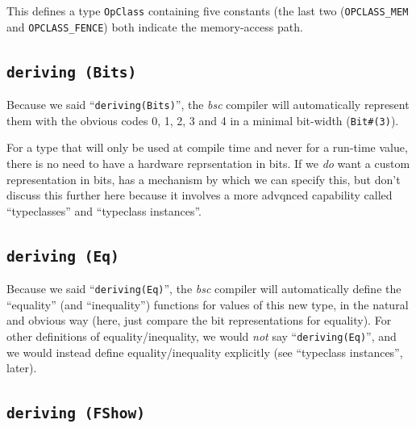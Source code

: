 
This defines a type \verb|OpClass| containing five constants (the last
two (\verb|OPCLASS_MEM| and \verb|OPCLASS_FENCE|) both indicate the
memory-access path.


\subsection{{\tt deriving (Bits)}}

\label{Sec_deriving_Bits}


Because we said ``\verb|deriving(Bits)|'', the \emph{bsc} compiler
will automatically represent them with the obvious codes 0, 1, 2, 3
and 4 in a minimal bit-width (\verb|Bit#(3)|).

For a type that will only be used at compile time and never for a
run-time value, there is no need to have a hardware reprsentation in
bits.  If we \emph{do} want a custom representation in bits, {\BSV}
has a mechanism by which we can specify this, but don't discuss this
further here because it involves a more advqnced {\BSV} capability
called ``typeclasses'' and ``typeclass instances''.


\subsection{{\tt deriving (Eq)}}

\label{Sec_deriving_Eq}


Because we said ``\verb|deriving(Eq)|'', the \emph{bsc} compiler will
automatically define the ``equality'' (and ``inequality'') functions
for values of this new type, in the natural and obvious way (here,
just compare the bit representations for equality).  For other
definitions of equality/inequality, we would \emph{not} say
``\verb|deriving(Eq)|'', and we would instead define
equality/inequality explicitly (see ``typeclass instances'', later).


\subsection{{\tt deriving (FShow)}}

